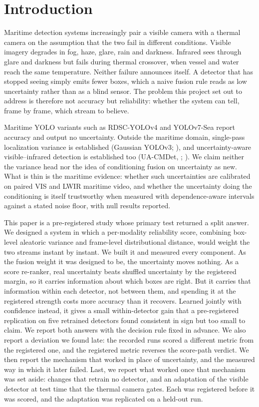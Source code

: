 \documentclass[10pt]{article}
\begin{document}
\section{Introduction}\label{sec:1}
Maritime detection systems increasingly pair a visible camera with a thermal camera on the assumption that the two fail in different conditions. Visible imagery degrades in fog, haze, glare, rain and darkness. Infrared sees through glare and darkness but fails during thermal crossover, when vessel and water reach the same temperature. Neither failure announces itself. A detector that has stopped seeing simply emits fewer boxes, which a naive fusion rule reads as low uncertainty rather than as a blind sensor. The problem this project set out to address is therefore not accuracy but reliability: whether the system can tell, frame by frame, which stream to believe.

Maritime YOLO variants such as RDSC-YOLOv4 \citep{liu2021sea} and YOLOv7-Sea \citep{zhao2023yolov7sea} report accuracy and output no uncertainty. Outside the maritime domain, single-pass localization variance is established (Gaussian YOLOv3; \citealp{choi2019gaussian}), and uncertainty-aware visible--infrared detection is established too (UA-CMDet, \citealp{sun2022dronebased}; \citealp{zhao2024uncertaintyaware}). We claim neither the variance head nor the idea of conditioning fusion on uncertainty as new. What is thin is the maritime evidence: whether such uncertainties are calibrated on paired VIS and LWIR maritime video, and whether the uncertainty doing the conditioning is itself trustworthy when measured with dependence-aware intervals against a stated noise floor, with null results reported.

This paper is a pre-registered study whose primary test returned a split answer. We designed a system in which a per-modality reliability score, combining box-level aleatoric variance and frame-level distributional distance, would weight the two streams instant by instant. We built it and measured every component. As the fusion weight it was designed to be, the uncertainty moves nothing. As a score re-ranker, real uncertainty beats shuffled uncertainty by the registered margin, so it carries information about which boxes are right. But it carries that information within each detector, not between them, and spending it at the registered strength costs more accuracy than it recovers. Learned jointly with confidence instead, it gives a small within-detector gain that a pre-registered replication on five retrained detectors found consistent in sign but too small to claim. We report both answers with the decision rule fixed in advance. We also report a deviation we found late: the recorded runs scored a different metric from the registered one, and the registered metric reverses the score-path verdict. We then report the mechanism that worked in place of uncertainty, and the measured way in which it later failed. Last, we report what worked once that mechanism was set aside: changes that retrain no detector, and an adaptation of the visible detector at test time that the thermal camera gates. Each was registered before it was scored, and the adaptation was replicated on a held-out run.
\end{document}

